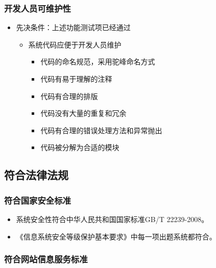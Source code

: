 \documentclass[hyperref, a4paper]{ctexart}
\providecommand{\tightlist}{%
  \setlength{\itemsep}{0pt}\setlength{\parskip}{0pt}}
\begin{document}
\hypertarget{ux5f00ux53d1ux4ebaux5458ux53efux7ef4ux62a4ux6027}{%
\subsubsection{开发人员可维护性}\label{ux5f00ux53d1ux4ebaux5458ux53efux7ef4ux62a4ux6027}}

\begin{itemize}
\tightlist
\item
  先决条件：上述功能测试项已经通过

  \begin{itemize}
  \tightlist
  \item
    系统代码应便于开发人员维护

    \begin{itemize}
    \tightlist
    \item
      代码的命名规范，采用驼峰命名方式
    \item
      代码有易于理解的注释
    \item
      代码有合理的排版
    \item
      代码没有大量的重复和冗余
    \item
      代码有合理的错误处理方法和异常抛出
    \item
      代码被分解为合适的模块
    \end{itemize}
  \end{itemize}
\end{itemize}

\hypertarget{ux7b26ux5408ux6cd5ux5f8bux6cd5ux89c4}{%
\subsection{符合法律法规}\label{ux7b26ux5408ux6cd5ux5f8bux6cd5ux89c4}}

\hypertarget{ux7b26ux5408ux56fdux5bb6ux5b89ux5168ux6807ux51c6}{%
\subsubsection{符合国家安全标准}\label{ux7b26ux5408ux56fdux5bb6ux5b89ux5168ux6807ux51c6}}

\begin{itemize}
\tightlist
\item
  系统安全性符合中华人民共和国国家标准GB/T 22239-2008。
\item
  《信息系统安全等级保护基本要求》中每一项出题系统都符合。
\end{itemize}

\hypertarget{ux7b26ux5408ux7f51ux7ad9ux4fe1ux606fux670dux52a1ux6807ux51c6}{%
\subsubsection{符合网站信息服务标准}\label{ux7b26ux5408ux7f51ux7ad9ux4fe1ux606fux670dux52a1ux6807ux51c6}}
\end{document}
